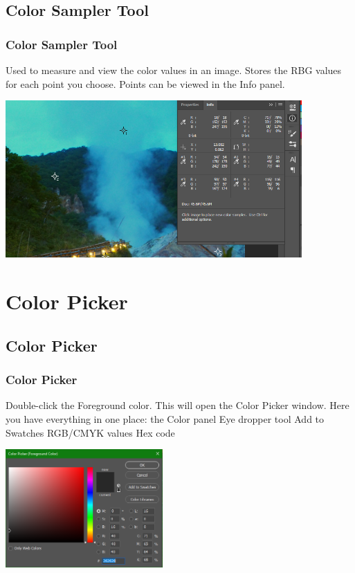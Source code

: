 \documentclass{beamer}
\begin{document}
			\subsection{Color Sampler Tool}		
				\begin{frame}
					\frametitle{Color Sampler Tool}
									\begin{outline}
						\1 Used to measure and view the color values in an image.
						\1 Stores the RBG values for each point you choose.
						\1 Points can be viewed in the Info panel.
					\end{outline}
					\includegraphics[width=0.85\textwidth]{images/color sampler tool.png}
				\end{frame}
			
					\section{Color Picker}
					\subsection{Color Picker}		
				\begin{frame}
					\frametitle{Color Picker}
														\begin{outline}
						\1 Double-click the Foreground color.  
						\1 This will open the Color Picker window.
						\1 Here you have everything in one place:
						\2 the Color panel
						\2 Eye dropper tool
						\2 Add to Swatches
						\2 RGB/CMYK values
						\2 Hex code 
					\end{outline}
				\begin{center}
					\includegraphics[width=0.45\textwidth]{images/color picker.png}
					\end{center}
				\end{frame}

	
\end{document}
